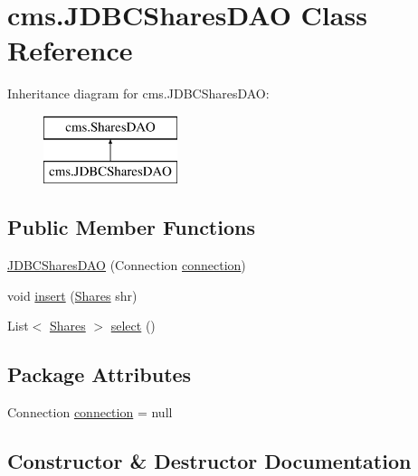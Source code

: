 \hypertarget{classcms_1_1_j_d_b_c_shares_d_a_o}{}\section{cms.\+J\+D\+B\+C\+Shares\+D\+AO Class Reference}
\label{classcms_1_1_j_d_b_c_shares_d_a_o}
Inheritance diagram for cms.\+J\+D\+B\+C\+Shares\+D\+AO\+:\begin{figure}[H]
\begin{center}
\leavevmode
\includegraphics[height=2.000000cm]{classcms_1_1_j_d_b_c_shares_d_a_o}
\end{center}
\end{figure}
\subsection*{Public Member Functions}
\begin{DoxyCompactItemize}
\item 
\mbox{\hyperlink{classcms_1_1_j_d_b_c_shares_d_a_o_a52f44074043d29f7b8d24749dd84f8aa}{J\+D\+B\+C\+Shares\+D\+AO}} (Connection \mbox{\hyperlink{classcms_1_1_j_d_b_c_shares_d_a_o_a55148864b3f3a771f61d1ac5a2bf841f}{connection}})
\item 
void \mbox{\hyperlink{classcms_1_1_j_d_b_c_shares_d_a_o_a085c86e21861e14636c1e213ee522cbd}{insert}} (\mbox{\hyperlink{classcms_1_1_shares}{Shares}} shr)
\item 
List$<$ \mbox{\hyperlink{classcms_1_1_shares}{Shares}} $>$ \mbox{\hyperlink{classcms_1_1_j_d_b_c_shares_d_a_o_a0413a9f3a13a2939aa617d0c55a33e46}{select}} ()
\end{DoxyCompactItemize}
\subsection*{Package Attributes}
\begin{DoxyCompactItemize}
\item 
Connection \mbox{\hyperlink{classcms_1_1_j_d_b_c_shares_d_a_o_a55148864b3f3a771f61d1ac5a2bf841f}{connection}} = null
\end{DoxyCompactItemize}


\subsection{Constructor \& Destructor Documentation}
\mbox{\label{classcms_1_1_j_d_b_c_shares_d_a_o_a52f44074043d29f7b8d24749dd84f8aa}} 
